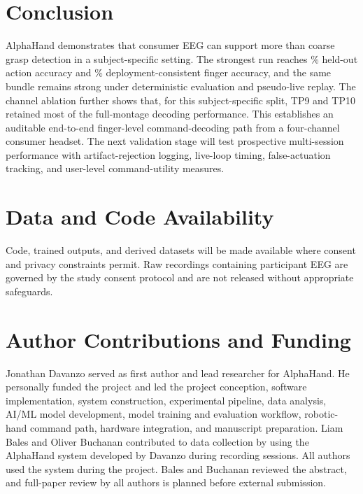 \documentclass[conference]{IEEEtran}
\begin{document}
\section{Conclusion}

AlphaHand demonstrates that consumer EEG can support more than coarse grasp detection in a subject-specific setting. The strongest run reaches \FeaturedActionAcc\% held-out action accuracy and \FeaturedFingerAcc\% deployment-consistent finger accuracy, and the same bundle remains strong under deterministic evaluation and pseudo-live replay. The channel ablation further shows that, for this subject-specific split, TP9 and TP10 retained most of the full-montage decoding performance. This establishes an auditable end-to-end finger-level command-decoding path from a four-channel consumer headset. The next validation stage will test prospective multi-session performance with artifact-rejection logging, live-loop timing, false-actuation tracking, and user-level command-utility measures.

\section*{Data and Code Availability}

Code, trained outputs, and derived datasets will be made available where consent and privacy constraints permit. Raw recordings containing participant EEG are governed by the study consent protocol and are not released without appropriate safeguards.

\section*{Author Contributions and Funding}

Jonathan Davanzo served as first author and lead researcher for AlphaHand. He personally funded the project and led the project conception, software implementation, system construction, experimental pipeline, data analysis, AI/ML model development, model training and evaluation workflow, robotic-hand command path, hardware integration, and manuscript preparation. Liam Bales and Oliver Buchanan contributed to data collection by using the AlphaHand system developed by Davanzo during recording sessions. All authors used the system during the project. Bales and Buchanan reviewed the abstract, and full-paper review by all authors is planned before external submission.



\end{document}
